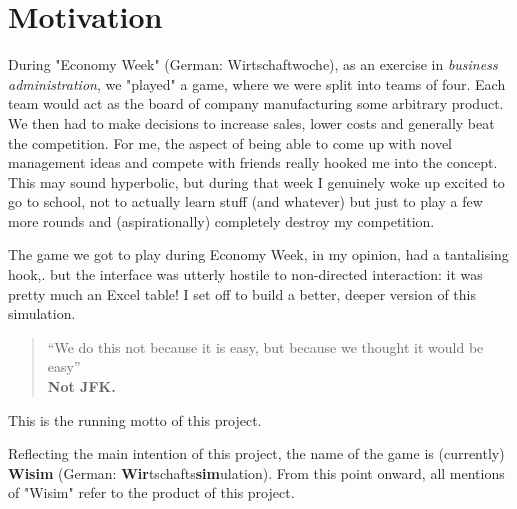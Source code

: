\section{Motivation}

During "Economy Week" (German: Wirtschaftwoche), as an exercise in \textit{business administration}, we "played"
a game, where we were split into teams of four. Each team would act as the board of company manufacturing some arbitrary product.
We then had to make decisions to increase sales, lower costs and generally beat the competition. For me, the aspect
of being able to come up with novel management ideas and compete with friends really hooked me into the concept. This may sound hyperbolic,
but during that week I genuinely woke up excited to go to school, not to actually learn stuff (and whatever) but just to
play a few more rounds and (aspirationally) completely destroy my competition.

The game we got to play during Economy Week, in my opinion, had a tantalising hook,. but the interface was utterly
hostile to non-directed interaction: it was pretty much an Excel table! I set off to build a better, deeper
version of this simulation.

\begin{quote}
	“We do this not because it is easy, but because we thought it would be easy” \\
	\null \hfill \textbf{Not JFK.}
\end{quote}

This is the running motto of this project.

Reflecting the main intention of this project, the name of the game is (currently) \textbf{Wisim} (German:
\textbf{Wir}tschafts\textbf{sim}ulation). From this point onward, all mentions of "Wisim" refer to the product of this
project.
